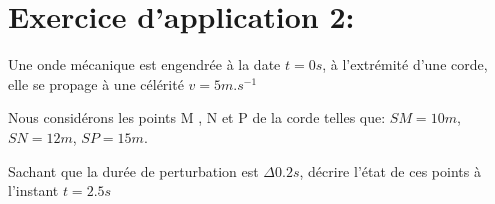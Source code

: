 \documentclass[12pt]{article}
\begin{document}
\section{Exercice d’application 2:}
Une onde mécanique est engendrée à la date $t=0s$, à l’extrémité d’une corde, elle se propage à une célérité $v = 5m.s^{-1}$

Nous considérons les points M , N et P de la corde telles que: $SM=10m$, $SN=12m$, $SP=15m$.

Sachant que la durée de perturbation est $\Delta{0.2s}$, décrire l’état de ces points à l’instant $t=2.5s$



\end{document}
